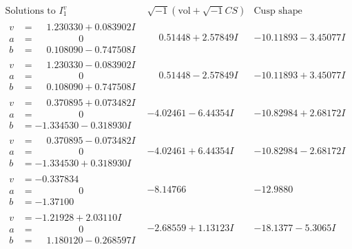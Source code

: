 \documentclass[1p]{elsarticle_modified}
\theoremstyle{definition}
\newcommand{\I}{\sqrt{-1}}
\begin{document}
$$\begin{array}{c|c|c}  
\text{Solutions to }I^v_{1}& \I (\text{vol} + \sqrt{-1}CS) & \text{Cusp shape}\\
 \hline 
\begin{aligned}
v &= \phantom{-}1.230330 + 0.083902 I \\
a &= \phantom{-0.000000 } 0 \\
b &= \phantom{-}0.108090 - 0.747508 I\end{aligned}
 & \phantom{-}0.51448 + 2.57849 I & -10.11893 - 3.45077 I \\ \hline\begin{aligned}
v &= \phantom{-}1.230330 - 0.083902 I \\
a &= \phantom{-0.000000 } 0 \\
b &= \phantom{-}0.108090 + 0.747508 I\end{aligned}
 & \phantom{-}0.51448 - 2.57849 I & -10.11893 + 3.45077 I \\ \hline\begin{aligned}
v &= \phantom{-}0.370895 + 0.073482 I \\
a &= \phantom{-0.000000 } 0 \\
b &= -1.334530 - 0.318930 I\end{aligned}
 & -4.02461 - 6.44354 I & -10.82984 + 2.68172 I \\ \hline\begin{aligned}
v &= \phantom{-}0.370895 - 0.073482 I \\
a &= \phantom{-0.000000 } 0 \\
b &= -1.334530 + 0.318930 I\end{aligned}
 & -4.02461 + 6.44354 I & -10.82984 - 2.68172 I \\ \hline\begin{aligned}
v &= -0.337834\phantom{ +0.000000I} \\
a &= \phantom{-0.000000 } 0 \\
b &= -1.37100\phantom{ +0.000000I}\end{aligned}
 & -8.14766\phantom{ +0.000000I} & -12.9880\phantom{ +0.000000I} \\ \hline\begin{aligned}
v &= -1.21928 + 2.03110 I \\
a &= \phantom{-0.000000 } 0 \\
b &= \phantom{-}1.180120 - 0.268597 I\end{aligned}
 & -2.68559 + 1.13123 I & -18.1377 - 5.3065 I \\ \hline\begin{aligned}

\end{aligned}
\end{array}$$
\end{document}
